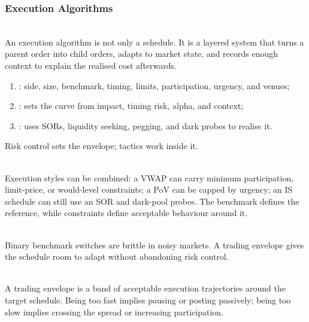 \subsubsection{Execution Algorithms}

\begin{principle} \\
An execution algorithm is not only a schedule. It is a layered system that turns a parent order into child orders, adapts to market state, and records enough context to explain the realised cost afterwards.
\end{principle}

\begin{taxonomy} 
\begin{enumerate}[label=\roman*.]
\setlength{\itemsep}{0pt}
\item {}: side, size, benchmark, timing, limits, participation, urgency, and venues;
\item {}: sets the curve from impact, timing risk, alpha, and context;
\item {}: uses SORs, liquidity seeking, pegging, and dark probes to realise it.
\end{enumerate}
Risk control sets the envelope; tactics work inside it.
\end{taxonomy}

\begin{principle} \\
Execution styles can be combined: a VWAP can carry minimum participation, limit-price, or would-level constraints; a PoV can be capped by urgency; an IS schedule can still use an SOR and dark-pool probes. The benchmark defines the reference, while constraints define acceptable behaviour around it.
\end{principle}

\begin{caveat} \\
Binary benchmark switches are brittle in noisy markets. A trading envelope gives the schedule room to adapt without abandoning risk control.
\end{caveat}

\begin{definition} \\
A trading envelope is a band of acceptable execution trajectories around the target schedule. Being too fast implies pausing or posting passively; being too slow implies crossing the spread or increasing participation.
\end{definition}


